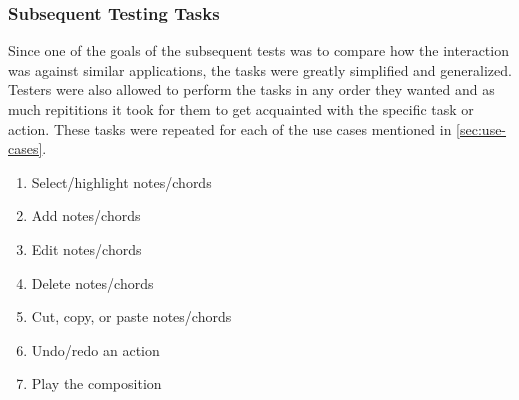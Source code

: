 \subsubsection{Subsequent Testing Tasks}
\label{sec:subsequent-tasks}

Since one of the goals of the subsequent tests was to compare how the interaction was against similar applications, the tasks were greatly simplified and generalized. Testers were also allowed to perform the tasks in any order they wanted and as much repititions it took for them to get acquainted with the specific task or action. These tasks were repeated for each of the use cases mentioned in \ref{sec:use-cases}.

\begin{enumerate}
  \item Select/highlight notes/chords
  \item Add notes/chords
  \item Edit notes/chords
  \item Delete notes/chords
  \item Cut, copy, or paste notes/chords
  \item Undo/redo an action
  \item Play the composition
\end{enumerate}

